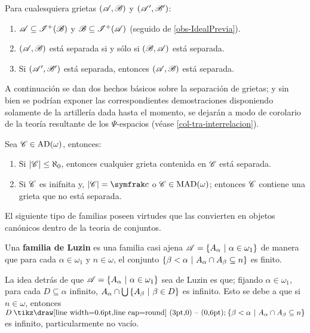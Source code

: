  \begin{observacion}\label{obs-GrietasSimple}
  Para cualesquiera grietas $(\mathscr{A},\mathscr{B})$ y $(\mathscr{A}',\mathscr{B}')$:
  \begin{enumerate}
   \item $\mathscr{A} \subseteq \mathscr{I}^+(\mathscr{B})$ y $\mathscr{B} \subseteq \mathscr{I}^+(\mathscr{A})$ (seguido de \autoref{obs-IdealPrevia}).
   \item $(\mathscr{A},\mathscr{B})$ está separada si y sólo si $(\mathscr{B},\mathscr{A})$ está separada.
   \item Si $(\mathscr{A}',\mathscr{B}')$ está separada, entonces $(\mathscr{A},\mathscr{B})$ está separada.
  \end{enumerate}
 \end{observacion}

 A continuación se dan dos hechos básicos sobre la separación de grietas; y sin bien se podrían exponer las correspondientes demostraciones disponiendo solamente de la artillería dada hasta el momento, se dejarán a modo de corolario de la teoría resultante de los $\Psi$-espacios (véase \ref{col-tra-interrelacion}).

 \begin{ejemplo}\label{ej-interrelacion}
  Sea $\mathscr{C}\in \operatorname{AD}(\omega)$, entonces:
        \begin{enumerate}
            \item Si $|\mathscr{C}|\leq \aleph_0$, entonces cualquier grieta contenida en $\mathscr{C}$ está separada.
            \item Si $\mathscr{C}$ es inifnita y, $|\ms{C}|=\mathfrak{c}$ o $\mathscr{C}\in \operatorname{MAD}(\omega)$; entonces $\mathscr{C}$ contiene una grieta que no está separada.
        \end{enumerate}
 \end{ejemplo}

 El siguiente tipo de familias poseen virtudes que las convierten en objetos canónicos dentro de la teoria  de conjuntos.

 \begin{definicion}\label{def-LuzinFam}
  Una \textbf{familia de Luzin} es una familia casi ajena $\mathscr{A}=\{A_\alpha \text{ $|$ } \alpha \in \omega_1 \}$ de manera que para cada $\alpha \in \omega_1$ y $n \in \omega$, el conjunto $ \{ \beta<\alpha \text{ $|$ } A_\alpha \cap A_\beta \subseteq n \} $ es finito.
 \end{definicion}

 La idea detrás de que $\mathscr{A}=\{A_\alpha \text{ $|$ } \alpha \in \omega_1 \}$ sea de Luzin es que; fijando $\alpha \in \omega_1$, para cada $D \subseteq \alpha$ infinito, $A_\alpha \cap \mbox{$\bigcup$}\,\{A_\beta \text{ $|$ } \beta \in D\}$ es infinito. Esto se debe a que si $n \in \omega$, entonces $D \setminus \{ \beta<\alpha \tq A_\alpha \cap A_\beta \subseteq n \} $ es infinito, particularmente no vacío.

